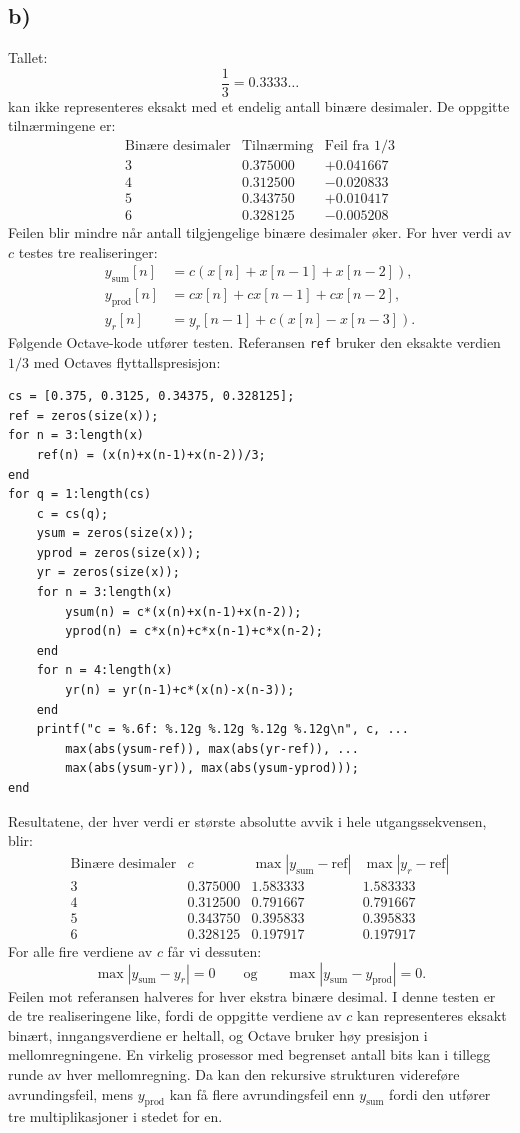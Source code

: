 \subsection*{b)}
Tallet:
\[
\frac{1}{3}
=
0.3333\ldots
\]
kan ikke representeres eksakt med et endelig antall binære
desimaler.
De oppgitte tilnærmingene er:
\[
\begin{array}{c|c|c}
\text{Binære desimaler} &
\text{Tilnærming} &
\text{Feil fra }1/3 \\
\hline
3 & 0.375000 & +0.041667 \\
4 & 0.312500 & -0.020833 \\
5 & 0.343750 & +0.010417 \\
6 & 0.328125 & -0.005208
\end{array}
\]
Feilen blir mindre når antall tilgjengelige binære desimaler
øker.
For hver verdi av $c$ testes tre realiseringer:
\[
\begin{aligned}
y_{\mathrm{sum}}[n]&=c(x[n]+x[n-1]+x[n-2]),\\
y_{\mathrm{prod}}[n]&=cx[n]+cx[n-1]+cx[n-2],\\
y_r[n]&=y_r[n-1]+c(x[n]-x[n-3]).
\end{aligned}
\]
Følgende Octave-kode utfører testen. Referansen \texttt{ref} bruker
den eksakte verdien $1/3$ med Octaves flyttallspresisjon:
\begin{verbatim}
cs = [0.375, 0.3125, 0.34375, 0.328125];
ref = zeros(size(x));
for n = 3:length(x)
    ref(n) = (x(n)+x(n-1)+x(n-2))/3;
end
for q = 1:length(cs)
    c = cs(q);
    ysum = zeros(size(x));
    yprod = zeros(size(x));
    yr = zeros(size(x));
    for n = 3:length(x)
        ysum(n) = c*(x(n)+x(n-1)+x(n-2));
        yprod(n) = c*x(n)+c*x(n-1)+c*x(n-2);
    end
    for n = 4:length(x)
        yr(n) = yr(n-1)+c*(x(n)-x(n-3));
    end
    printf("c = %.6f: %.12g %.12g %.12g %.12g\n", c, ...
        max(abs(ysum-ref)), max(abs(yr-ref)), ...
        max(abs(ysum-yr)), max(abs(ysum-yprod)));
end
\end{verbatim}
Resultatene, der hver verdi er største absolutte avvik i hele
utgangssekvensen, blir:
\[
\begin{array}{c|c|c|c}
\text{Binære desimaler} & c &
\max|y_{\mathrm{sum}}-\mathrm{ref}| &
\max|y_r-\mathrm{ref}| \\
\hline
3 & 0.375000 & 1.583333 & 1.583333 \\
4 & 0.312500 & 0.791667 & 0.791667 \\
5 & 0.343750 & 0.395833 & 0.395833 \\
6 & 0.328125 & 0.197917 & 0.197917
\end{array}
\]
For alle fire verdiene av $c$ får vi dessuten:
\[
\max|y_{\mathrm{sum}}-y_r|=0
\qquad \text{og} \qquad
\max|y_{\mathrm{sum}}-y_{\mathrm{prod}}|=0.
\]
Feilen mot referansen halveres for hver ekstra binære desimal. I
denne testen er de tre realiseringene like, fordi de oppgitte
verdiene av $c$ kan representeres eksakt binært, inngangsverdiene
er heltall, og Octave bruker høy presisjon i mellomregningene.
En virkelig prosessor med begrenset antall bits kan i tillegg runde
av hver mellomregning. Da kan den rekursive strukturen videreføre
avrundingsfeil, mens $y_{\mathrm{prod}}$ kan få flere
avrundingsfeil enn $y_{\mathrm{sum}}$ fordi den utfører tre
multiplikasjoner i stedet for en.